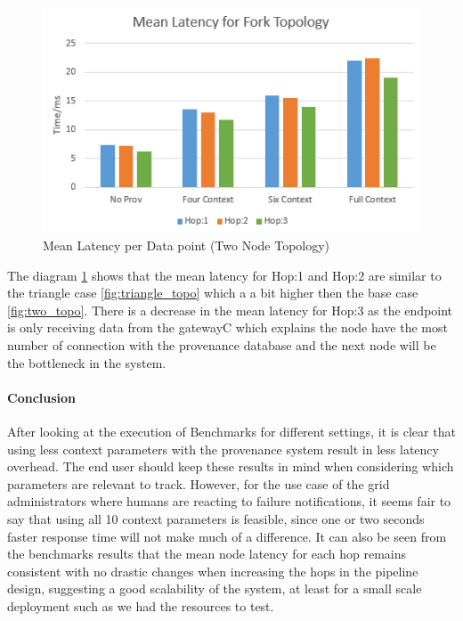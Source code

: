 \begin{figure}[H]
	\center
	\includegraphics[width=\textwidth]{figures/ForkTopology_latency.PNG}
	\caption{Mean Latency per Data point  (Two Node Topology)}
	\label{fig:forktopo_latency}
\end{figure}

The diagram \ref{fig:forktopo_latency} shows that the mean latency for Hop:1 and Hop:2 are similar to the triangle case \ref{fig:triangle_topo} which a a bit higher then the base case \ref{fig:two_topo}. There is a decrease in the mean latency for Hop:3 as the endpoint is only receiving data from the gatewayC which explains the node have the most number of connection with the provenance database and the next node will be the bottleneck in the system. 

\paragraph*{Conclusion}
After looking at the execution of Benchmarks for different settings, it is clear that using less context parameters with the provenance system result in less latency overhead. 
The end user should keep these results in mind when considering which parameters are relevant to track.
However, for the use case of the grid administrators where humans are reacting to failure notifications, it seems fair to say that using all 10 context parameters is feasible, since one or two seconds faster response time will not make much of a difference.
It can also be seen from the benchmarks results that the mean node latency for each hop remains consistent with no drastic changes when increasing the hops in the pipeline design, suggesting a good scalability of the system, at least for a small scale deployment such as we had the resources to test.


